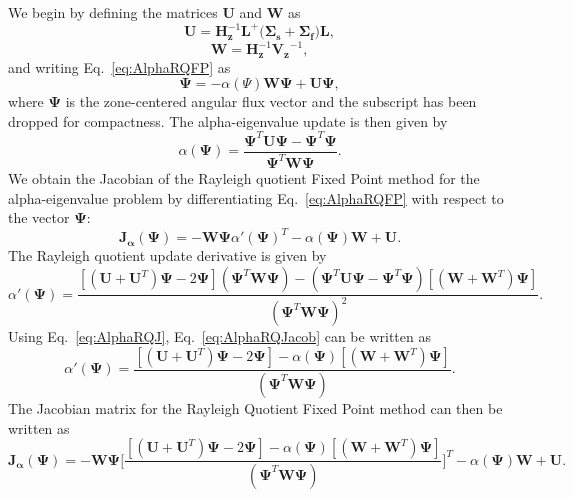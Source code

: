  We begin by defining the matrices $\mathbf{U}$ and $\mathbf{W}$ as
\begin{equation}
	\mathbf{U} = \mathbf{H}_{\mathbf{z}}^{-1} \mathbf{L}^{+} \big ( \mathbf{\Sigma_{s}} + \mathbf{\Sigma_{f}} ) \mathbf{L},
\end{equation} 
\begin{equation}
	\mathbf{W} = \mathbf{H}_{\mathbf{z}}^{-1} \mathbf{V_{z}}^{-1},
\end{equation}
and writing Eq.~\ref{eq:AlphaRQFP} as
\begin{equation}
	\mathbf{\Psi} = -\alpha(\Psi) \mathbf{W} \mathbf{\Psi} + \mathbf{U} \mathbf{\Psi},
\end{equation}
where $\mathbf{\Psi}$ is the zone-centered angular flux vector and the subscript has been dropped for compactness.
The alpha-eigenvalue update is then given by
\begin{equation}
	\alpha(\mathbf{\Psi}) =  \frac{\mathbf{\Psi}^{T} \mathbf{U} \mathbf{\Psi} - \mathbf{\Psi}^{T} \mathbf{\Psi}}{\mathbf{\Psi}^{T} \mathbf{W} \mathbf{\Psi}}.
	\label{eq:AlphaRQJ}
\end{equation}
We obtain the Jacobian of the Rayleigh quotient Fixed Point method for the alpha-eigenvalue problem by differentiating Eq.~\ref{eq:AlphaRQFP} with respect to the vector $\mathbf{\Psi}$:
\begin{equation}
	\mathbf{J_{\alpha}}(\mathbf{\Psi}) = -\mathbf{W} \mathbf{\Psi} \alpha'(\mathbf{\Psi})^{T} - \alpha(\mathbf{\Psi}) \mathbf{W} + \mathbf{U}.
\end{equation}
The Rayleigh quotient update derivative is given by
\begin{equation}
	\alpha'(\mathbf{\Psi}) = \frac{[(\mathbf{U}+\mathbf{U}^{T})\mathbf{\Psi} - 2\mathbf{\Psi}](\mathbf{\Psi}^{T} \mathbf{W} \mathbf{\Psi}) - (\mathbf{\Psi}^{T} \mathbf{U} \mathbf{\Psi} - \mathbf{\Psi}^{T} \mathbf{\Psi})[(\mathbf{W} + \mathbf{W}^{T})\mathbf{\Psi}]}{(\mathbf{\Psi}^{T} \mathbf{W} \mathbf{\Psi})^{2}}.
	\label{eq:AlphaRQJacob}
\end{equation}
Using Eq.~\ref{eq:AlphaRQJ}, Eq.~\ref{eq:AlphaRQJacob} can be written as
\begin{equation}
	\alpha'(\mathbf{\Psi}) = \frac{[(\mathbf{U}+\mathbf{U}^{T})\mathbf{\Psi} - 2\mathbf{\Psi}] - \alpha(\mathbf{\Psi})[(\mathbf{W} + \mathbf{W}^{T})\mathbf{\Psi}]}{(\mathbf{\Psi}^{T} \mathbf{W} \mathbf{\Psi})}.
	\label{eq:SimAlphaRQ}
\end{equation}
The Jacobian matrix for the Rayleigh Quotient Fixed Point method can then be written as
\begin{equation}
	\mathbf{J_{\alpha}}(\mathbf{\Psi}) = -\mathbf{W} \mathbf{\Psi} \bigg [ \frac{[(\mathbf{U}+\mathbf{U}^{T})\mathbf{\Psi} - 2\mathbf{\Psi}] - \alpha(\mathbf{\Psi})[(\mathbf{W} + \mathbf{W}^{T})\mathbf{\Psi}]}{(\mathbf{\Psi}^{T} \mathbf{W} \mathbf{\Psi})} \bigg ]^{T} - \alpha(\mathbf{\Psi}) \mathbf{W} + \mathbf{U}.
\end{equation}


